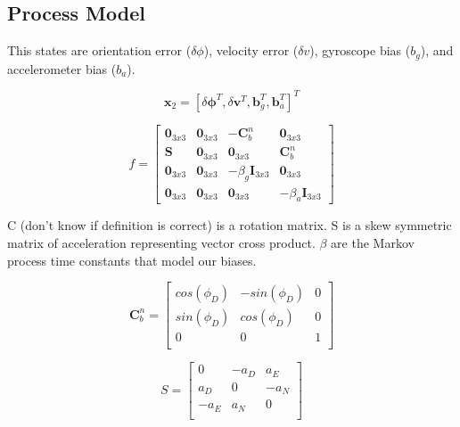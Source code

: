 \subsection{Process Model}

This states are orientation error ($\delta\phi$), velocity error ($\delta v$), 
gyroscope bias ($b_g$), and accelerometer bias ($b_a$).

\begin{equation}
  \boldsymbol{x}_2 = [\delta\boldsymbol{\phi}^T, \delta\boldsymbol{v}^T,
       \boldsymbol{b}^T_g, \boldsymbol{b}^T_a]^T
\end{equation}


\begin{equation}
  f = \begin{bmatrix}
        \boldsymbol{0}_{3x3} & \boldsymbol{0}_{3x3} & \boldsymbol{-C}^n_b & \boldsymbol{0}_{3x3} \\
        \boldsymbol{S} & \boldsymbol{0}_{3x3} & \boldsymbol{0}_{3x3} & \boldsymbol{C}^n_b \\
        \boldsymbol{0}_{3x3} & \boldsymbol{0}_{3x3} & -\beta_g\boldsymbol{I}_{3x3} & \boldsymbol{0}_{3x3} \\
        \boldsymbol{0}_{3x3} & \boldsymbol{0}_{3x3} & \boldsymbol{0}_{3x3} & -\beta_a\boldsymbol{I}_{3x3}
      \end{bmatrix}
\end{equation}

C (don't know if definition is correct) is a rotation matrix. S is a skew symmetric matrix of acceleration representing
vector cross product. $\beta$ are the Markov process time constants that model our
biases. 

\begin{equation}
  \boldsymbol{C}^n_b = \begin{bmatrix}
        cos(\phi_D) & -sin(\phi_D) & 0 \\
        sin(\phi_D) &  cos(\phi_D) & 0 \\
        0 & 0 & 1 \\
      \end{bmatrix}
\end{equation}

\begin{equation}
  S = \begin{bmatrix}
        0 & -a_D & a_E \\
        a_D & 0 & -a_N \\
        -a_E & a_N & 0 \\
      \end{bmatrix}
\end{equation}

